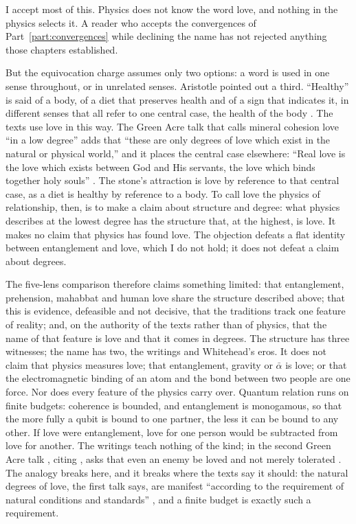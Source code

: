 I accept most of this. Physics does not know the word love, and nothing in the physics selects it. A reader who accepts the convergences of Part~\ref{part:convergences} while declining the name has not rejected anything those chapters established.

But the equivocation charge assumes only two options: a word is used in one sense throughout, or in unrelated senses. Aristotle pointed out a third. ``Healthy'' is said of a body, of a diet that preserves health and of a sign that indicates it, in different senses that all refer to one central case, the health of the body \citep{Aristotle_Metaphysics}. The \bahai texts use love in this way. The Green Acre talk that calls mineral cohesion love ``in a low degree'' adds that ``these are only degrees of love which exist in the natural or physical world,'' and it places the central case elsewhere: ``Real love is the love which exists between God and His servants, the love which binds together holy souls'' \citep[Talk 89]{PUP}. The stone's attraction is love by reference to that central case, as a diet is healthy by reference to a body. To call love the physics of relationship, then, is to make a claim about structure and degree: what physics describes at the lowest degree has the structure that, at the highest, is love. It makes no claim that physics has found love. The objection defeats a flat identity between entanglement and love, which I do not hold; it does not defeat a claim about degrees.

The five-lens comparison therefore claims something limited: that entanglement, prehension, mahabbat and human love share the structure described above; that this is evidence, defeasible and not decisive, that the traditions track one feature of reality; and, on the authority of the \bahai texts rather than of physics, that the name of that feature is love and that it comes in degrees. The structure has three witnesses; the name has two, the writings and Whitehead's eros. It does not claim that physics measures love; that entanglement, gravity or $\bar{\alpha}$ is love; or that the electromagnetic binding of an atom and the bond between two people are one force. Nor does every feature of the physics carry over. Quantum relation runs on finite budgets: coherence is bounded, and entanglement is monogamous, so that the more fully a qubit is bound to one partner, the less it can be bound to any other. If love were entanglement, love for one person would be subtracted from love for another. The writings teach nothing of the kind; in the second Green Acre talk \AbdulBaha, citing \Bahaullah, asks that even an enemy be loved and not merely tolerated \citep[Talk 92]{PUP}. The analogy breaks here, and it breaks where the texts say it should: the natural degrees of love, the first talk says, are manifest ``according to the requirement of natural conditions and standards'' \citep[Talk 89]{PUP}, and a finite budget is exactly such a requirement.


